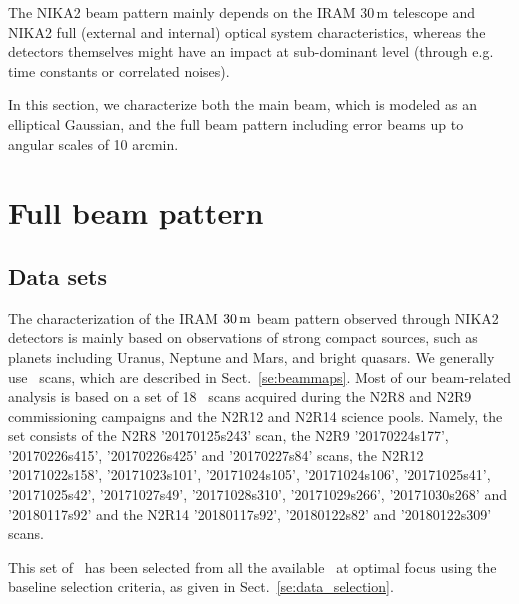 

The NIKA2 beam pattern mainly depends on the IRAM 30\,m telescope and
NIKA2 full (external and internal) optical system characteristics,
whereas the detectors themselves might have an impact at sub-dominant
level (through e.g. time constants or correlated noises).

In this section, we characterize both the main beam, which is
modeled as an elliptical Gaussian, and the full beam pattern including
error beams up to angular scales of 10 arcmin.

\section{Full beam pattern}%
\label{se:fullbeam}

\subsection{Data sets}
\label{se:beammap_set}

The characterization of the IRAM $30\,\rm{m}$ beam pattern observed
through NIKA2 detectors is mainly based on observations of strong
compact sources, such as planets including Uranus, Neptune and Mars,
and bright quasars. We generally use \bm\ scans, which are described
in Sect.~\ref{se:beammaps}.
Most of our beam-related analysis is based on a
set of 18 \bm\ scans acquired during the N2R8 and N2R9 commissioning
campaigns and the N2R12 and N2R14 science pools. Namely, the set
consists of the N2R8 '20170125s243' scan, the N2R9 '20170224s177',
'20170226s415', '20170226s425' and '20170227s84' scans, the N2R12
'20171022s158', '20171023s101', '20171024s105', '20171024s106',
'20171025s41', '20171025s42',  '20171027s49',  '20171028s310',
'20171029s266', '20171030s268' and  '20180117s92' and the N2R14
'20180117s92',  '20180122s82' and  '20180122s309' scans.

This set of \bms\ has been selected from all the available \bms\ at
optimal focus using the baseline selection criteria, as given in
Sect.~\ref{se:data_selection}.



